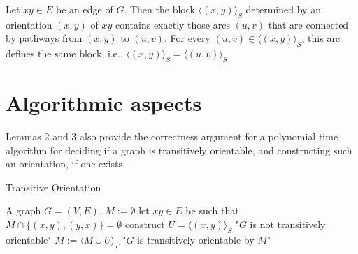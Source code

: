 \begin{prop}
	Let $xy \in E$ be an edge of $G$. Then the block $\langle(x, y)\rangle_S$ determined by an orientation $(x, y)$ of $xy$ contains exactly those arcs $(u, v)$ that are connected by pathways from $(x, y)$ to $(u, v)$. For every $(u, v) \in \langle(x, y)\rangle_S$, this arc defines the same block, i.e., $\langle(x, y)\rangle_S = \langle(u, v)\rangle_S$.
\end{prop}


\section{Algorithmic aspects}

Lemmas 2 and 3 also provide the correctness argument for a polynomial time algorithm for deciding if a graph is transitively orientable, and constructing such an orientation, if one exists.

\begin{algorithm}[!ht]
	\caption{Transitive Orientation}
	\begin{algorithmic}[1]
		\Require A graph $G = (V,E)$.
		\State $M := \emptyset$
			\State let $xy \in E$ be such that $M \cap \{(x,y), (y,x)\} = \emptyset$
			\State construct $U = \langle (x,y) \rangle_S$
				\State \Return "$G$ is not transitively orientable"
			\Else
				\State $M := \langle M \cup U \rangle_T$
			\EndIf
		\EndWhile
		\State \Return "$G$ is transitively orientable by $M$"
	\end{algorithmic}
\end{algorithm}
